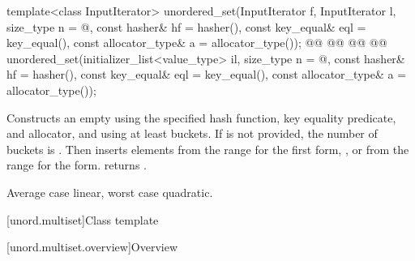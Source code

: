 \documentclass{wg21}
\begin{document}
%
\begin{itemdecl}
template<class InputIterator>
unordered_set(InputIterator f, InputIterator l,
    size_type n = @\seebelow@,
    const hasher& hf = hasher(),
    const key_equal& eql = key_equal(),
    const allocator_type& a = allocator_type());
@@
@@
    @@
    @@
unordered_set(initializer_list<value_type> il,
    size_type n = @\seebelow@,
    const hasher& hf = hasher(),
    const key_equal& eql = key_equal(),
    const allocator_type& a = allocator_type());
\end{itemdecl}

\begin{itemdescr}
    \pnum
    \effects
    Constructs an empty  using the
    specified hash function, key equality predicate, and allocator, and
    using at least  buckets. If  is not
    provided, the number of buckets is . Then
    inserts elements from the range 
    for the first form, , or from the range
     for the  form.
     returns .

    \pnum
    \complexity
    Average case linear, worst case quadratic.
\end{itemdescr}

[unord.multiset]{Class template }%

[unord.multiset.overview]{Overview}
\end{document}
